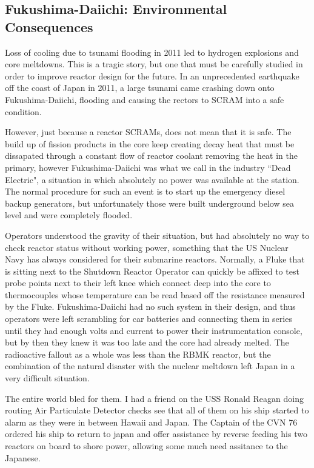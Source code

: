 \documentclass[12pt]{article}
\begin{document}
\subsection{Fukushima-Daiichi: Environmental Consequences}
Loss of cooling due to tsunami flooding in 2011 led to hydrogen explosions and core meltdowns. This is a tragic story, but one that must be carefully studied in order to improve reactor design for the future. In an unprecedented earthquake off the coast of Japan in 2011, a large tsunami came crashing down onto Fukushima-Daiichi, flooding and causing the rectors to SCRAM into a safe condition.

However, just because a reactor SCRAMs, does not mean that it is safe. The build up of fission products in the core keep creating decay heat that must be dissapated through a constant flow of reactor coolant removing the heat in the primary, however Fukushima-Daiichi was what we call in the industry ``Dead Electric", a situation in which absolutely no power was available at the station. The normal procedure for such an event is to start up the emergency diesel backup generators, but unfortunately those were built underground below sea level and were completely flooded.

Operators understood the gravity of their situation, but had absolutely no way to check reactor status without working power, something that the US Nuclear Navy has always considered for their submarine reactors. Normally, a Fluke that is sitting next to the Shutdown Reactor Operator can quickly be affixed to test probe points next to their left knee which connect deep into the core to thermocouples whose temperature can be read based off the resistance measured by the Fluke. Fukushima-Daiichi had no such system in their design, and thus operators were left scrambling for car batteries and connecting them in series until they had enough volts and current to power their instrumentation console, but by then they knew it was too late and the core had already melted. The radioactive fallout as a whole was less than the RBMK reactor, but the combination of the natural disaster with the nuclear meltdown left Japan in a very difficult situation.

The entire world bled for them. I had a friend on the USS Ronald Reagan doing routing Air Particulate Detector checks see that all of them on his ship started to alarm as they were in between Hawaii and Japan. The Captain of the CVN 76 ordered his ship to return to japan and offer assistance by reverse feeding his two reactors on board to shore power, allowing some much need assitance to the Japanese.
\end{document}
